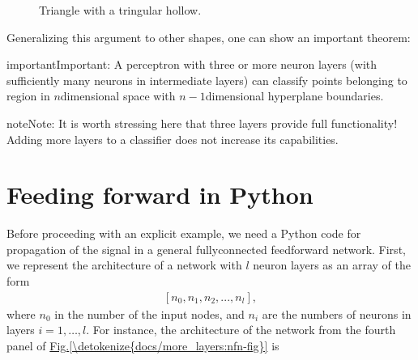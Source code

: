 \documentclass[letterpaper,10pt,english]{jupyterBook}
\let\sphinxpxdimen\pdfpxdimen\else\newdimen\sphinxpxdimen
\begin{document}
\begin{figure}[htbp]
\centering
\capstart

\noindent\sphinxincludegraphics[width=200\sphinxpxdimen]{{tritri}.png}
\caption{Triangle with a tringular hollow.}\label{\detokenize{docs/more_layers:tri-fig}}\end{figure}

\sphinxAtStartPar
Generalizing this argument to other shapes, one can show an important theorem:

\begin{sphinxadmonition}{important}{Important:}
\sphinxAtStartPar
A perceptron with three or more neuron layers (with sufficiently many neurons in intermediate layers) can classify points belonging to  region in \(n\)\sphinxhyphen{}dimensional space with \(n-1\)\sphinxhyphen{}dimensional hyperplane boundaries.
\end{sphinxadmonition}

\begin{sphinxadmonition}{note}{Note:}
\sphinxAtStartPar
It is worth stressing here that three layers provide full functionality! Adding more layers to a classifier does not increase its capabilities.
\end{sphinxadmonition}


\section{Feeding forward in Python}
\label{\detokenize{docs/more_layers:feeding-forward-in-python}}
\sphinxAtStartPar
Before proceeding with an explicit example, we need a Python code for propagation of the signal in a general fully\sphinxhyphen{}connected feed\sphinxhyphen{}forward network. First, we represent the architecture of a network with \(l\) neuron layers as an array of the form
\begin{equation*}
\begin{split}[n_0,n_1,n_2,...,n_l],\end{split}
\end{equation*}
\sphinxAtStartPar
where \(n_0\) in the number of the input nodes, and \(n_i\) are the numbers of neurons in layers \(i=1,\dots,l\). For instance, the architecture of the network from the fourth panel of \hyperref[\detokenize{docs/more_layers:nfn-fig}]{Fig.\@ \ref{\detokenize{docs/more_layers:nfn-fig}}} is

\begin{sphinxVerbatim}[commandchars=\\\{\}]
\PYG{p}{[}\PYG{p}{]} 
\end{sphinxVerbatim}
\end{document}
